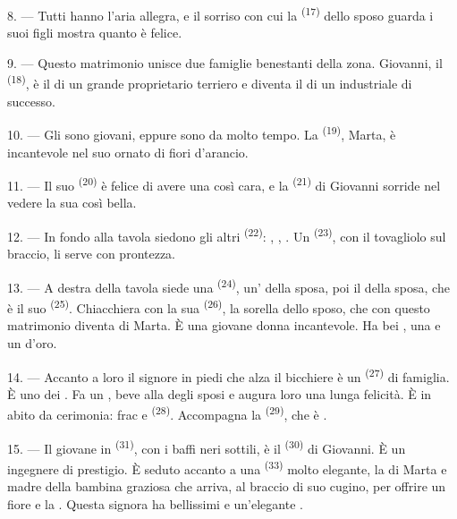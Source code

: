 \VUsaut{3.0mm}

8. --- Tutti hanno l'aria allegra, e il sorriso con cui la 
\textsuperscript{(17)} dello sposo guarda i suoi figli mostra quanto è felice.

9. --- Questo matrimonio unisce due famiglie benestanti della zona. Giovanni, il
 \textsuperscript{(18)}, è il  di un grande proprietario
terriero e diventa il  di un industriale di successo.

10. --- Gli  sono giovani, eppure sono  da molto tempo.
La  \textsuperscript{(19)}, Marta, è incantevole nel suo
 ornato di fiori d'arancio.

11. --- Il suo  \textsuperscript{(20)} è felice di avere una
 così cara, e la  \textsuperscript{(21)} di Giovanni
sorride nel vedere la sua  così bella.

12. --- In fondo alla tavola siedono gli altri 
\textsuperscript{(22)}: , , . Un
 \textsuperscript{(23)}, con il tovagliolo sul braccio, li serve
con prontezza.

\VUsaut{3.0mm}

13. --- A destra della tavola siede una  \textsuperscript{(24)},
un' della sposa, poi il  della sposa, che è il suo
 \textsuperscript{(25)}. Chiacchiera con la sua
 \textsuperscript{(26)}, la sorella dello sposo, che con
questo matrimonio diventa  di Marta. È una giovane donna incantevole.
Ha bei , una  e un 
d'oro.

14. --- Accanto a loro il signore in piedi che alza il bicchiere è un 
\textsuperscript{(27)} di famiglia. È uno dei . Fa un
, beve alla  degli sposi e augura loro una lunga
felicità. È in abito da cerimonia: frac e 
\textsuperscript{(28)}. Accompagna la  \textsuperscript{(29)}, che è
.

15. --- Il giovane in  \textsuperscript{(31)}, con i baffi neri sottili, è
il  \textsuperscript{(30)} di Giovanni. È un ingegnere di prestigio.
È seduto accanto a una  \textsuperscript{(33)} molto elegante, la
 di Marta e madre della bambina graziosa che arriva, al
braccio di suo cugino, per offrire un fiore e  la .
Questa signora ha bellissimi  e un'elegante .

